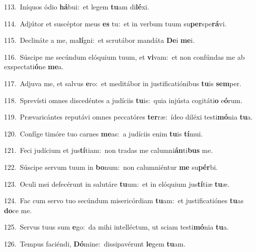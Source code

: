 {\numbfont\textcolor{\numbcolor}{113.}}~Iníquos ódio \textbf{há}\-bui:~\star et legem \textbf{tu}\-am di\-\textbf{lé}\-xi.\par
{\numbfont\textcolor{\numbcolor}{114.}}~Adjútor et suscéptor meus \textbf{es} tu:~\star et in verbum tuum su\-\textbf{per}\-spe\-\textbf{rá}\-vi.\par
{\numbfont\textcolor{\numbcolor}{115.}}~Declináte a me, ma\-\textbf{lí}\-gni:~\star et scrutábor mandáta \textbf{De}\-i \textbf{me}\-i.\par
{\numbfont\textcolor{\numbcolor}{116.}}~Súscipe me secúndum elóquium tuum, et \textbf{vi}\-vam:~\star et non confúndas me ab exspectati\-\textbf{ó}\-ne \textbf{me}\-a.\par
{\numbfont\textcolor{\numbcolor}{117.}}~Adjuva me, et salvus \textbf{e}\-ro:~\star et meditábor in justificatiónibus \textbf{tu}\-is \textbf{sem}\-per.\par
{\numbfont\textcolor{\numbcolor}{118.}}~Sprevísti omnes discedéntes a judíciis \textbf{tu}\-is:~\star quia injústa cogitáti\textbf{o} e\-\textbf{ó}\-rum.\par
{\numbfont\textcolor{\numbcolor}{119.}}~Prævaricántes reputávi omnes peccatóres \textbf{ter}\-ræ:~\star ídeo diléxi testi\-\textbf{mó}\-nia \textbf{tu}\-a.\par
{\numbfont\textcolor{\numbcolor}{120.}}~Confíge timóre tuo carnes \textbf{me}\-as:~\star a judíciis enim \textbf{tu}\-is \textbf{tí}\-mui.\par
{\numbfont\textcolor{\numbcolor}{121.}}~Feci judícium et jus\-\textbf{tí}\-tiam:~\star non tradas me calumni\-\textbf{án}\-ti\textbf{bus} me.\par
{\numbfont\textcolor{\numbcolor}{122.}}~Súscipe servum tuum in \textbf{bo}\-num:~\star non calumniéntur \textbf{me} su\-\textbf{pér}\-bi.\par
{\numbfont\textcolor{\numbcolor}{123.}}~Oculi mei defecérunt in salutáre \textbf{tu}\-um:~\star et in elóquium jus\-\textbf{tí}\-tiæ \textbf{tu}\-æ.\par
{\numbfont\textcolor{\numbcolor}{124.}}~Fac cum servo tuo secúndum misericórdiam \textbf{tu}\-am:~\star et justificatiónes \textbf{tu}\-as \textbf{do}\-ce me.\par
{\numbfont\textcolor{\numbcolor}{125.}}~Servus tuus sum \textbf{e}\-go:~\star da mihi intelléctum, ut sciam testi\-\textbf{mó}\-nia \textbf{tu}\-a.\par
{\numbfont\textcolor{\numbcolor}{126.}}~Tempus faciéndi, \textbf{Dó}\-mine:~\star dissipavérunt \textbf{le}\-gem \textbf{tu}\-am.\par
